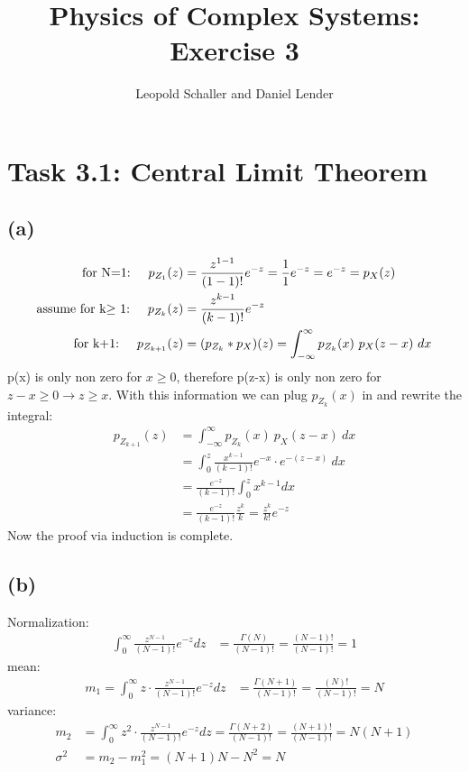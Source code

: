 \documentclass{article}
\title{Physics of Complex Systems: Exercise 3}
\author{Leopold Schaller and Daniel Lender}
\begin{document}
\maketitle

\section*{Task 3.1: Central Limit Theorem}
\subsection*{(a)}
\begin{align}
    \text{for N=1:}\hspace{0.5cm} p_{Z_1}(z)&=\frac{z^{1-1}}{(1-1)!}e^{-z}=\frac{1}{1}e^{-z}=e^{-z}=p_X(z)\\
    \text{assume for k$\ge$ 1:}\hspace{0.5cm} p_{Z_k}(z)&=\frac{z^{k-1}}{(k-1)!}e^{-z}\\
    \text{for k+1:}\hspace{0.5cm}  p_{Z_{k+1}}(z)&= (p_{Z_k}\ast p_X)(z)=\int_{-\infty}^{\infty}p_{Z_k}(x)\ p_X(z-x)\ dx
\end{align}
p(x) is only non zero for $x\ge0$, therefore p(z-x) is only non zero for $z-x\ge0\rightarrow z\ge x$. With this information we can plug $p_{Z_k}(x)$ in and rewrite the integral:
\begin{align}
     p_{Z_{k+1}}(z)&=\int_{-\infty}^{\infty}p_{Z_k}(x)\ p_X(z-x)\ dx\\
     &=\int_0^z \frac{x^{k-1}}{(k-1)!}e^{-x} \cdot e^{-(z-x)}\ dx\\
     &=\frac{e^{-z}}{(k-1)!}\int_0^zx^{k-1} dx \\
     &=\frac{e^{-z}}{(k-1)!}\frac{z^{k}}{k}=\frac{z^{k}}{k!}e^{-z}
\end{align}
Now the proof via induction is complete.
\subsection*{(b)}
Normalization:
\begin{align}
    \int_0^{\infty} \frac{z^{N-1}}{(N-1)!}e^{-z} dz &= \frac{\Gamma(N)}{(N-1)!}=\frac{(N-1)!}{(N-1)!}=1
\end{align}
mean:
\begin{align}
    m_1=\int_0^{\infty} z\cdot\frac{z^{N-1}}{(N-1)!}e^{-z} dz &= \frac{\Gamma(N+1)}{(N-1)!}=\frac{(N)!}{(N-1)!}=N
\end{align}
variance:
\begin{align}
    m_2 &=\int_0^{\infty} z^2\cdot\frac{z^{N-1}}{(N-1)!}e^{-z} dz = \frac{\Gamma(N+2)}{(N-1)!}=\frac{(N+1)!}{(N-1)!}=N(N+1)\\
    \sigma^2 &= m_2 - m_1^2 = (N+1)N-N^2= N
\end{align}
\end{document}
